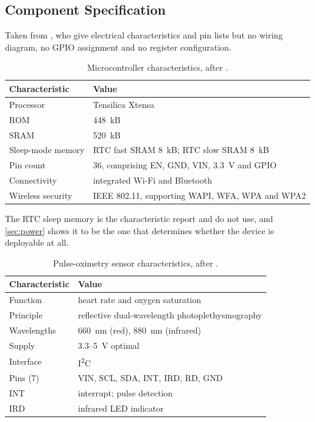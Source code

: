 \documentclass[12pt,a4paper,oneside]{report}
\begin{document}
\subsection{Component Specification}\label{sec:components}

Taken from \textcite{efendi2025}, who give electrical characteristics and pin lists but no wiring diagram, no GPIO assignment and no register configuration.

\begin{table}[htbp]
\centering\small
\caption{Microcontroller characteristics, after \textcite{efendi2025}.}\label{tab:esp32}
\begin{tabularx}{\textwidth}{@{}>{\raggedright\arraybackslash}p{4.4cm} X@{}}
\toprule
\textbf{Characteristic} & \textbf{Value} \\
\midrule
Processor & Tensilica Xtensa \\
ROM & 448~kB \\
SRAM & 520~kB \\
Sleep-mode memory & RTC fast SRAM 8~kB; RTC slow SRAM 8~kB \\
Pin count & 36, comprising EN, GND, VIN, 3.3~V and GPIO \\
Connectivity & integrated Wi-Fi and Bluetooth \\
Wireless security & IEEE 802.11, supporting WAPI, WFA, WPA and WPA2 \\
\bottomrule
\end{tabularx}
\end{table}

The RTC sleep memory is the characteristic \textcite{efendi2025} report and do not use, and \cref{sec:power} shows it to be the one that determines whether the device is deployable at all.

\begin{table}[htbp]
\centering\small
\caption{Pulse-oximetry sensor characteristics, after \textcite{efendi2025}.}\label{tab:max30100}
\begin{tabularx}{\textwidth}{@{}>{\raggedright\arraybackslash}p{4.4cm} X@{}}
\toprule
\textbf{Characteristic} & \textbf{Value} \\
\midrule
Function & heart rate and oxygen saturation \\
Principle & reflective dual-wavelength photoplethysmography \\
Wavelengths & 660~nm (red), 880~nm (infrared) \\
Supply & 3.3--5~V optimal \\
Interface & I\textsuperscript{2}C \\
Pins (7) & VIN, SCL, SDA, INT, IRD, RD, GND \\
INT & interrupt; pulse detection \\
IRD & infrared LED indicator \\
\bottomrule
\end{tabularx}
\end{table}
\end{document}
